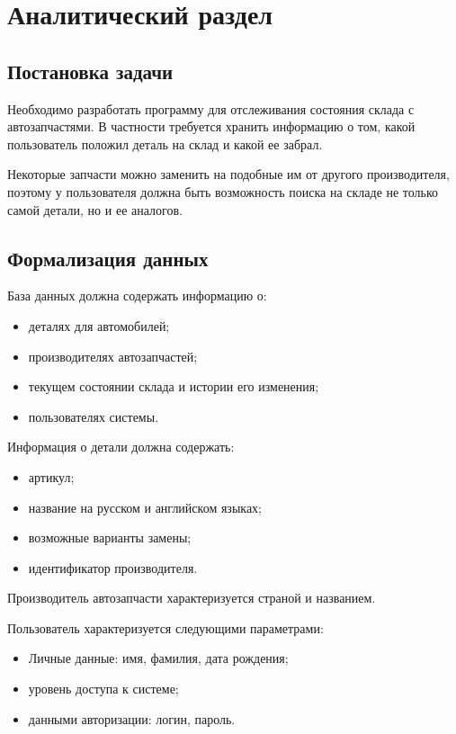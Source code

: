 \chapter{Аналитический раздел}

\section{Постановка задачи}
Необходимо разработать программу для отслеживания состояния склада с автозапчастями. В частности требуется хранить информацию о том, какой пользователь положил деталь на склад и какой ее забрал.

Некоторые запчасти можно заменить на подобные им от другого производителя, поэтому у пользователя должна быть возможность поиска на складе не только самой детали, но и ее аналогов.

\section{Формализация данных}\label{sec:formalisation}
База данных должна содержать информацию о:
\begin{itemize}
	\item деталях для автомобилей;
	\item производителях автозапчастей;
	\item текущем состоянии склада и истории его изменения;
	\item пользователях системы.
\end{itemize}

Информация о детали должна содержать:
\begin{itemize}
	\item артикул;
	\item название на русском и английском языках;
	\item возможные варианты замены;
	\item идентификатор производителя.
\end{itemize}

Производитель автозапчасти характеризуется страной и названием.

Пользователь характеризуется следующими параметрами:
\begin{itemize}
	\item Личные данные: имя, фамилия, дата рождения;
	\item уровень доступа к системе;
	\item данными авторизации: логин, пароль.
\end{itemize}

